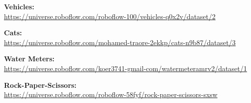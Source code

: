 \documentclass[12pt, a4paper]{article}
\begin{document}
\textbf{Vehicles:} \\
\url{https://universe.roboflow.com/roboflow-100/vehicles-q0x2v/dataset/2}

\textbf{Cats:} \\
\url{https://universe.roboflow.com/mohamed-traore-2ekkp/cats-n9b87/dataset/3}

\textbf{Water Meters:} \\
\url{https://universe.roboflow.com/koer3741-gmail-com/watermeteramrv2/dataset/1}

\textbf{Rock-Paper-Scissors:} \\
\url{https://universe.roboflow.com/roboflow-58fyf/rock-paper-scissors-sxsw}
\end{document}

